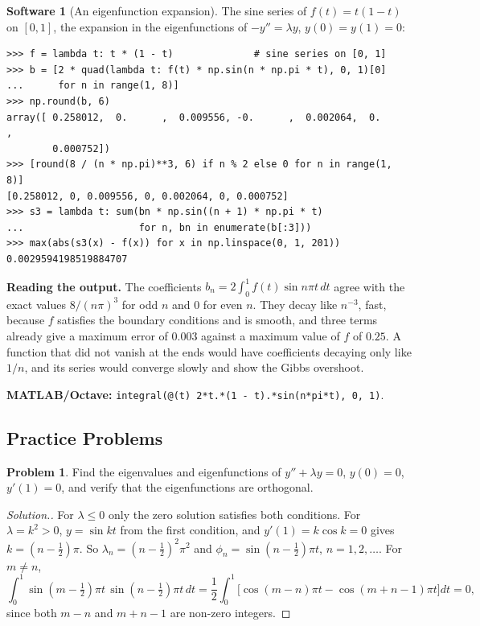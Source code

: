\documentclass[11pt,a4paper]{article}
\numberwithin{equation}{section}
\theoremstyle{definition}
\newtheorem{software}[thm]{Software}
\newtheorem{problemx}{Problem}[subsection]
\newenvironment{problem}{\begin{problemx}}{\end{problemx}}
\newenvironment{solution}
  {\renewcommand{\qedsymbol}{}\begin{proof}[\textit{Solution}.]}
  {\end{proof}}
\begin{document}
\begin{software}[An eigenfunction expansion]
\label{sw:expansion}
The sine series of $f(t) = t(1 - t)$ on $[0, 1]$, the expansion in the eigenfunctions of $-y'' = \lambda y$, $y(0) = y(1) = 0$:
{\small\begin{verbatim}
>>> f = lambda t: t * (1 - t)              # sine series on [0, 1]
>>> b = [2 * quad(lambda t: f(t) * np.sin(n * np.pi * t), 0, 1)[0]
...      for n in range(1, 8)]
>>> np.round(b, 6)
array([ 0.258012,  0.      ,  0.009556, -0.      ,  0.002064,  0.      ,
        0.000752])
>>> [round(8 / (n * np.pi)**3, 6) if n % 2 else 0 for n in range(1, 8)]
[0.258012, 0, 0.009556, 0, 0.002064, 0, 0.000752]
>>> s3 = lambda t: sum(bn * np.sin((n + 1) * np.pi * t)
...                    for n, bn in enumerate(b[:3]))
>>> max(abs(s3(x) - f(x)) for x in np.linspace(0, 1, 201))
0.0029594198519884707
\end{verbatim}}
\textbf{Reading the output.} The coefficients $b_n = 2\int_0^1f(t)\sin n\pi t\,dt$ agree with the exact values $8/(n\pi)^3$ for odd $n$ and $0$ for even $n$. They decay like $n^{-3}$, fast, because $f$ satisfies the boundary conditions
and is smooth, and three terms already give a maximum error of $0.003$ against a maximum value of $f$ of $0.25$. A function that did not vanish at the ends would have coefficients decaying only like $1/n$, and its
series would converge slowly and show the Gibbs overshoot.

\textbf{MATLAB/Octave:} \texttt{integral(@(t) 2*t.*(1 - t).*sin(n*pi*t), 0, 1)}.
\end{software}

\subsection{Practice Problems}

\begin{problem}
Find the eigenvalues and eigenfunctions of $y'' + \lambda y = 0$, $y(0) = 0$, $y'(1) = 0$, and verify that the eigenfunctions are orthogonal.
\end{problem}

\begin{solution}
For $\lambda \leq 0$ only the zero solution satisfies both conditions. For $\lambda = k^2 > 0$, $y = \sin kt$ from the first condition, and $y'(1) = k\cos k = 0$ gives $k = (n - \frac12)\pi$. So $\lambda_n = (n - \frac12)^2\pi^2$ and
$\phi_n = \sin(n - \frac12)\pi t$, $n = 1, 2, \dots$. For $m \neq n$,
\[
\int_0^1\sin(m - \tfrac12)\pi t\,\sin(n - \tfrac12)\pi t\,dt = \frac12\int_0^1\bigl[\cos(m - n)\pi t - \cos(m + n - 1)\pi t\bigr]dt = 0 ,
\]
since both $m - n$ and $m + n - 1$ are non-zero integers.
\end{solution}
\end{document}
